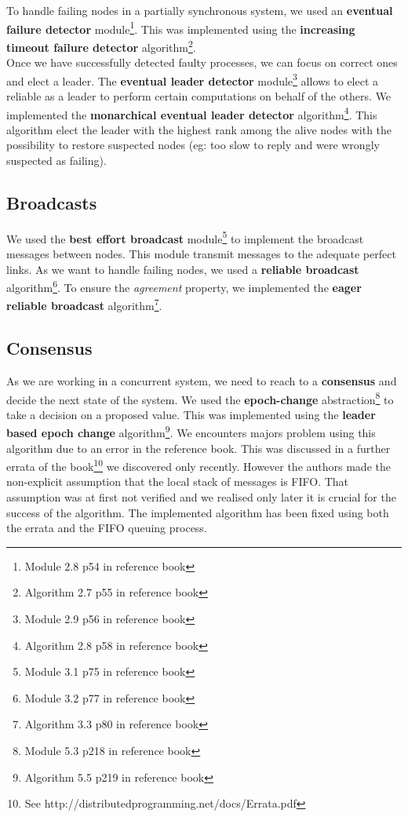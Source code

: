 \documentclass[11pt,english,a4paper]{article}
\begin{document}
To handle failing nodes in a partially synchronous system, we used an \textbf{eventual failure detector} module\footnote{Module 2.8 p54 in reference book}.
This was implemented using the \textbf{increasing timeout failure detector} algorithm\footnote{Algorithm 2.7 p55 in reference book}.\\

Once we have successfully detected faulty processes, we can focus on correct ones and elect a leader.
The \textbf{eventual leader detector} module\footnote{Module 2.9 p56 in reference book} allows to elect a reliable as a leader to perform certain computations on behalf of the others.
We implemented the \textbf{monarchical eventual leader detector} algorithm\footnote{Algorithm 2.8 p58 in reference book}.
This algorithm elect the leader with the highest rank among the alive nodes with the possibility to restore suspected nodes (eg: too slow to reply and were wrongly suspected as failing).

\subsection*{Broadcasts}
We used the \textbf{best effort broadcast} module\footnote{Module 3.1 p75 in reference book} to implement the broadcast messages between nodes.
This module transmit messages to the adequate perfect links.
As we want to handle failing nodes, we used a \textbf{reliable broadcast} algorithm\footnote{Module 3.2 p77 in reference book}.
To ensure the \emph{agreement} property, we implemented the \textbf{eager reliable broadcast} algorithm\footnote{Algorithm 3.3 p80 in reference book}.


\subsection*{Consensus}
As we are working in a concurrent system, we need to reach to a \textbf{consensus} and decide the next state of the system.
We used the \textbf{epoch-change} abstraction\footnote{Module 5.3 p218 in reference book} to take a decision on a proposed value.
This was implemented using the \textbf{leader based epoch change} algorithm\footnote{Algorithm 5.5 p219 in reference book}.
We encounters majors problem using this algorithm due to an error in the reference book.
This was discussed in a further errata of the book\footnote{See http://distributedprogramming.net/docs/Errata.pdf} we discovered only recently.
However the authors made the non-explicit assumption that the local stack of messages is FIFO.
That assumption was at first not verified and we realised only later it is crucial for the success of the algorithm.
The implemented algorithm has been fixed using both the errata and the FIFO queuing process.\\
\end{document}
